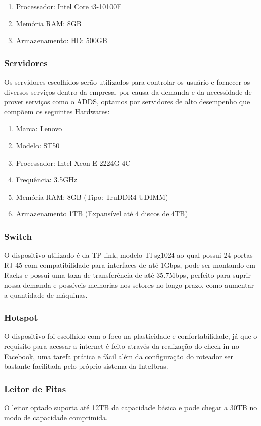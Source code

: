\documentclass[12pt]{article}
\begin{document}
\begin{enumerate}
    \item Processador: Intel Core i3-10100F
    \item Memória RAM: 8GB
    \item Armazenamento: HD: 500GB
\end{enumerate}

\subsubsection{Servidores}
Os servidores escolhidos serão utilizados para controlar os usuário e fornecer os diversos serviços dentro da empresa, por causa da demanda e da necessidade de prover serviços como o ADDS, optamos por servidores de alto desempenho que compõem os seguintes Hardwares:

\begin{enumerate}
    \item Marca: Lenovo
    \item Modelo: ST50
    \item Processador: Intel Xeon E-2224G 4C
    \item Frequência: 3.5GHz
    \item Memória RAM: 8GB (Tipo: TruDDR4 UDIMM)
    \item Armazenamento 1TB (Expansível até 4 discos de 4TB)
\end{enumerate}

\subsubsection{Switch}
O dispositivo utilizado é da TP-link, modelo Tl-sg1024 ao qual possui 24 portas RJ-45 com compatibilidade para interfaces de até 1Gbps, pode ser montando em Racks e possui uma taxa de transferência de até 35.7Mbps, perfeito para suprir nossa demanda e possíveis melhorias nos setores no longo prazo, como aumentar a quantidade de máquinas.

\subsubsection{Hotspot}
O dispositivo foi escolhido com o foco na plasticidade e confortabilidade, já que o requisito para acessar a internet é feito através da realização do check-in no Facebook, uma tarefa prática e fácil além da configuração do roteador ser bastante facilitada pelo próprio sistema da Intelbras.

\subsubsection{Leitor de Fitas}
O leitor optado suporta até 12TB da capacidade básica e pode chegar a 30TB no modo de capacidade comprimida.
\end{document}

